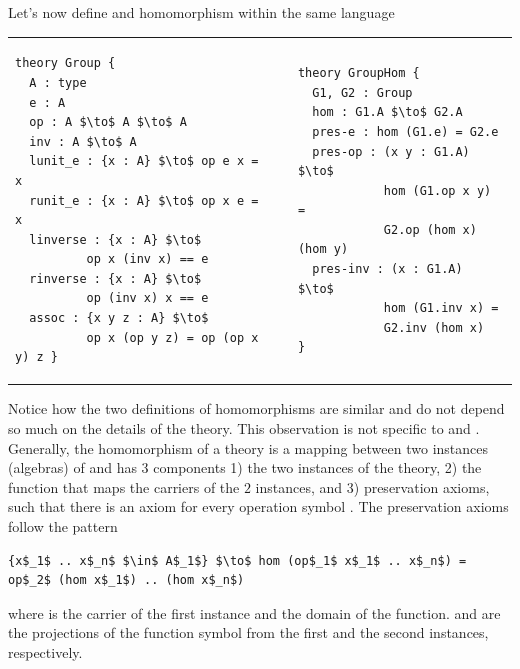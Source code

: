 Let's now define  and  homomorphism within the same language \\
\begin{tabular}[t]{p{6.3cm} p{1cm} p{6.3cm}}
\begin{lstlisting}[mathescape, basicstyle=\footnotesize]
theory Group {
  A : type 
  e : A
  op : A $\to$ A $\to$ A
  inv : A $\to$ A
  lunit_e : {x : A} $\to$ op e x = x
  runit_e : {x : A} $\to$ op x e = x
  linverse : {x : A} $\to$ 
          op x (inv x) == e
  rinverse : {x : A} $\to$ 
          op (inv x) x == e
  assoc : {x y z : A} $\to$ 
          op x (op y z) = op (op x y) z }
\end{lstlisting}
& &
\begin{lstlisting}[mathescape, basicstyle=\footnotesize]
theory GroupHom { 
  G1, G2 : Group 
  hom : G1.A $\to$ G2.A
  pres-e : hom (G1.e) = G2.e
  pres-op : (x y : G1.A) $\to$ 
            hom (G1.op x y) = 
            G2.op (hom x) (hom y)
  pres-inv : (x : G1.A) $\to$ 
            hom (G1.inv x) = 
            G2.inv (hom x)  }
\end{lstlisting}
\end{tabular}

Notice how the two definitions of homomorphisms are similar and do not depend so much on the details of the theory. This observation is not specific to  and . Generally, the homomorphism of a theory  is a mapping between two instances (algebras) of  and has $3$ components 1) the two instances of the theory, 2) the function  that maps the carriers of the $2$ instances, and 3) preservation axioms, such that there is an axiom  for every operation symbol . The preservation axioms follow the pattern
\begin{lstlisting}[mathescape]
{x$_1$ .. x$_n$ $\in$ A$_1$} $\to$ hom (op$_1$ x$_1$ .. x$_n$) = op$_2$ (hom x$_1$) .. (hom x$_n$)
\end{lstlisting}
where  is the carrier of the first instance and the domain of the  function.  and  are the projections of the function symbol  from the first and the second instances, respectively. 

